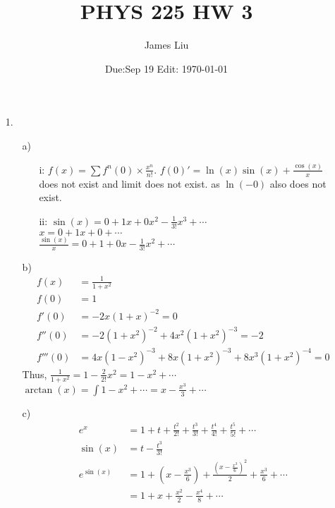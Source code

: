 \documentclass{article}
\date{Due:Sep 19 Edit: \today}
\title{PHYS 225 HW 3}
\author{James Liu}
\begin{document}
\maketitle
\begin{itemize}
    \item [1.]
    \begin{itemize}
        \item [a)] 
        \begin{itemize}
            \item [i:]
                \(f(x) = \sum f^{n}(0)\times \frac{x^n}{n!}\). \(f(0)' = \ln(x)\sin(x)+\frac{\cos(x)}{x}\) does not exist and limit does not exist.
                as \(\ln(-0)\) also does not exist.

            \item [ii:] \(\sin(x) = 0+1x+0x^2-\frac{1}{3!}x^3+\cdots\)\\
                        \(x = 0+1x+0+\cdots\)\\
                        \(\frac{\sin(x)}{x} = 0+1+0x-\frac{1}{3!}x^2+\cdots\)
        \end{itemize}
        \item [b)]
        \(\)
        \begin{align*}
            f(x)&=\frac{1}{1+x^2}\\
            f(0)&=1 \\
            f'(0)&=-2x(1+x)^{-2}=0\\
            f''(0)&=-2(1+x^2)^{-2}+4x^2(1+x^2)^{-3}=-2\\
            f'''(0)&=4x(1-x^2)^{-3}+8x(1+x^2)^{-3}+8x^3(1+x^2)^{-4}=0
        \end{align*}
        Thus, \(\frac{1}{1+x^2} = 1-\frac{2}{2!}x^2=1-x^2+\cdots\)\\
        \(\arctan(x) = \int1-x^2+\cdots = x-\frac{x^3}{3}+\cdots\)
        \item [c)]
        \begin{align*}
            e^x &= 1+t+\frac{t^2}{2!}+\frac{t^3}{3!}+\frac{t^4}{4!}+\frac{t^5}{5!}+\cdots\\
            \sin(x) &= t-\frac{t^3}{3!}\\
            e^{\sin(x)} &= 1 + \left(x - \frac{x^3}{6}\right) + \frac{\left(x - \frac{x^3}{6}\right)^2}{2} + \frac{x^3}{6} + \cdots\\
            &=1 + x + \frac{x^2}{2} - \frac{x^4}{8} +\cdots
        \end{align*}
    

\end{itemize}
\end{itemize}
\end{document}
